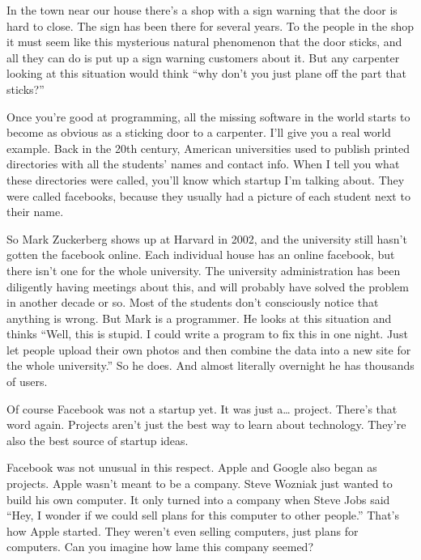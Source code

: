 \documentclass[12pt]{book}
\begin{document}
In the town near our house there's a shop with a sign warning that the
door is hard to close. The sign has been there for several years. To the
people in the shop it must seem like this mysterious natural phenomenon
that the door sticks, and all they can do is put up a sign warning
customers about it. But any carpenter looking at this situation would
think ``why don't you just plane off the part that sticks?''

Once you're good at programming, all the missing software in the world
starts to become as obvious as a sticking door to a carpenter. I'll give
you a real world example. Back in the 20th century, American
universities used to publish printed directories with all the students'
names and contact info. When I tell you what these directories were
called, you'll know which startup I'm talking about. They were called
facebooks, because they usually had a picture of each student next to
their name.

So Mark Zuckerberg shows up at Harvard in 2002, and the university still
hasn't gotten the facebook online. Each individual house has an online
facebook, but there isn't one for the whole university. The university
administration has been diligently having meetings about this, and will
probably have solved the problem in another decade or so. Most of the
students don't consciously notice that anything is wrong. But Mark is a
programmer. He looks at this situation and thinks ``Well, this is
stupid. I could write a program to fix this in one night. Just let
people upload their own photos and then combine the data into a new site
for the whole university.'' So he does. And almost literally overnight
he has thousands of users.

Of course Facebook was not a startup yet. It was just a\ldots{} project.
There's that word again. Projects aren't just the best way to learn
about technology. They're also the best source of startup ideas.

Facebook was not unusual in this respect. Apple and Google also began as
projects. Apple wasn't meant to be a company. Steve Wozniak just wanted
to build his own computer. It only turned into a company when Steve Jobs
said ``Hey, I wonder if we could sell plans for this computer to other
people.'' That's how Apple started. They weren't even selling computers,
just plans for computers. Can you imagine how lame this company seemed?
\end{document}
